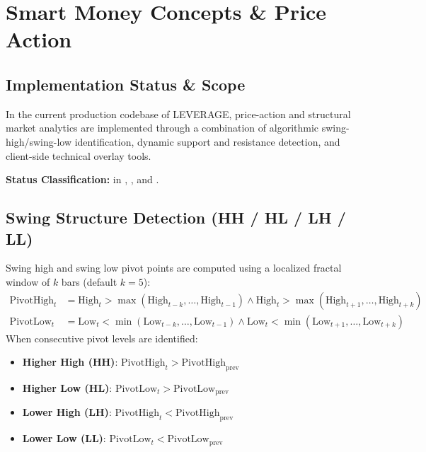 \chapter{Smart Money Concepts \& Price Action}
\label{ch:smc_price_action}

\section{Implementation Status \& Scope}
In the current production codebase of LEVERAGE, price-action and structural market analytics are implemented through a combination of algorithmic swing-high/swing-low identification, dynamic support and resistance detection, and client-side technical overlay tools.

\begin{citationbox}
\textbf{Status Classification:}  in , , and .
\end{citationbox}

\section{Swing Structure Detection (HH / HL / LH / LL)}
Swing high and swing low pivot points are computed using a localized fractal window of $k$ bars (default $k=5$):
\begin{align}
    \mathrm{PivotHigh}_t &= \mathrm{High}_t > \max(\mathrm{High}_{t-k}, \dots, \mathrm{High}_{t-1}) \land \mathrm{High}_t > \max(\mathrm{High}_{t+1}, \dots, \mathrm{High}_{t+k}) \\
    \mathrm{PivotLow}_t &= \mathrm{Low}_t < \min(\mathrm{Low}_{t-k}, \dots, \mathrm{Low}_{t-1}) \land \mathrm{Low}_t < \min(\mathrm{Low}_{t+1}, \dots, \mathrm{Low}_{t+k})
\end{align}
When consecutive pivot levels are identified:
\begin{itemize}[leftmargin=6mm,itemsep=1.5mm]
    \item \textbf{Higher High (HH)}: $\mathrm{PivotHigh}_t > \mathrm{PivotHigh}_{\mathrm{prev}}$
    \item \textbf{Higher Low (HL)}: $\mathrm{PivotLow}_t > \mathrm{PivotLow}_{\mathrm{prev}}$
    \item \textbf{Lower High (LH)}: $\mathrm{PivotHigh}_t < \mathrm{PivotHigh}_{\mathrm{prev}}$
    \item \textbf{Lower Low (LL)}: $\mathrm{PivotLow}_t < \mathrm{PivotLow}_{\mathrm{prev}}$
\end{itemize}

